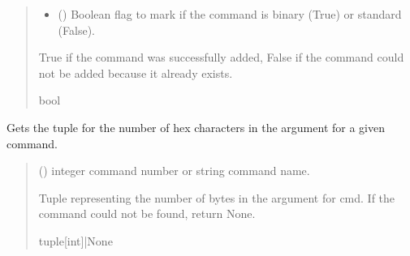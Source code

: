\documentclass[letterpaper,10pt,english]{sphinxmanual}
\begin{document}
\begin{fulllineitems}
\begin{fulllineitems}
\begin{quote}
\begin{description}
\begin{itemize}
\item {} 
\sphinxAtStartPar
{} () \textendash{} Boolean flag to mark if the command is binary (True) or standard (False).

\end{itemize}

\sphinxAtStartPar
True if the command was successfully added, False if the command could not be added                 because it already exists.

\sphinxAtStartPar
bool

\end{description}\end{quote}

\end{fulllineitems}


\begin{fulllineitems}
\label{\detokenize{PodCommands:PodCommands.POD_Commands.ArgumentHexChar}}
\pysigstartsignatures
{}
\pysigstopsignatures
\sphinxAtStartPar
Gets the tuple for the number of hex characters in the argument for a given command.
\begin{quote}\begin{description}
\sphinxAtStartPar
{} (\sphinxstyleliteralemphasis{\sphinxupquote{ | }}) \textendash{} integer command number or string command name.

\sphinxAtStartPar
Tuple representing the number of bytes in the argument for cmd. If the                 command could not be found, return None.

\sphinxAtStartPar
tuple{[}int{]}|None

\end{description}\end{quote}


\end{fulllineitems}
\end{fulllineitems}
\end{document}
